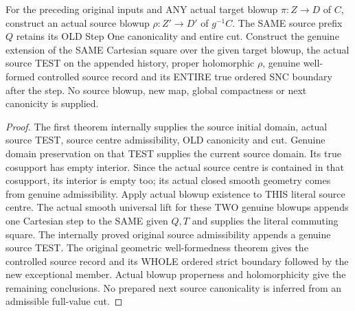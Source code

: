 \begin{theorem}
\label{hir:original-stepone-whole-cut-actual-source-extension}
\leanok
For the preceding original inputs and ANY actual target blowup
$\pi:Z\to D$ of $C$, construct an actual source blowup
$\rho:Z'\to D'$ of $g^{-1}C$. The SAME source prefix $Q$ retains its OLD
Step One canonicality and entire cut. Construct the genuine extension
of the SAME Cartesian square over the given target blowup, the actual
source TEST on the appended history, proper holomorphic $\rho$, genuine
well-formed controlled source record and its ENTIRE true ordered SNC
boundary after the step. No source blowup, new map, global compactness
or next canonicity is supplied.
\end{theorem}
\begin{proof}
The first theorem internally supplies the source initial domain, actual
source TEST, source centre admissibility, OLD canonicity and cut. Genuine
domain preservation on that TEST supplies the current source domain.
Its true cosupport has empty interior. Since the actual source centre
is contained in that cosupport, its interior is empty too; its actual
closed smooth geometry comes from genuine admissibility. Apply actual
blowup existence to THIS literal source centre. The actual smooth
universal lift for these TWO genuine blowups appends one Cartesian step
to the SAME given $Q,T$ and supplies the literal commuting square.
The internally proved original source admissibility appends a genuine
source TEST. The original geometric well-formedness theorem gives the
controlled source record and its WHOLE ordered strict boundary followed
by the new exceptional member. Actual blowup properness and
holomorphicity give the remaining conclusions. No prepared next source
canonicality is inferred from an admissible full-value cut.
\end{proof}
